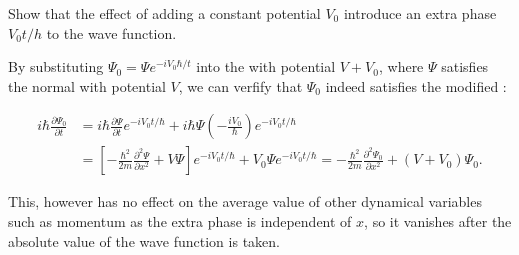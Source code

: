 \documentclass[a4paper,12pt]{report}
\begin{document}
{Show that the effect of adding a constant potential \(V_0\) introduce an extra phase \(V_0 t /h\) to the wave function.}
{By substituting \( \Psi_0 = \Psi e^{-i V_0 \hbar /t}\) into the \screq with potential \(V + V_0\), where \(\Psi\) satisfies the normal \screq with potential \(V\), we can verfify that \(\Psi_0\) indeed satisfies the modified \screq: 
			
\begin{equation}
	\begin{aligned}
		i \hbar \frac{\partial \Psi_0}{\partial t} & =i \hbar \frac{\partial \Psi}{\partial t} e^{-i V_0 t / \hbar}+i \hbar \Psi\left(-\frac{i V_0}{\hbar}\right) e^{-i V_0 t / \hbar} \\ &=\left[-\frac{\hbar^2}{2 m} \frac{\partial^2 \Psi}{\partial x^2}+V \Psi\right] e^{-i V_0 t / \hbar}+V_0 \Psi e^{-i V_0 t / \hbar} =-\frac{\hbar^2}{2 m} \frac{\partial^2 \Psi_0}{\partial x^2}+\left(V+V_0\right) \Psi_0 .
	\end{aligned}
\end{equation}
		
This, however has no effect on the average value of other dynamical variables such as momentum as the extra phase is independent of \(x\), so it vanishes after the absolute value of the wave function is taken.}
		
\end{document}
